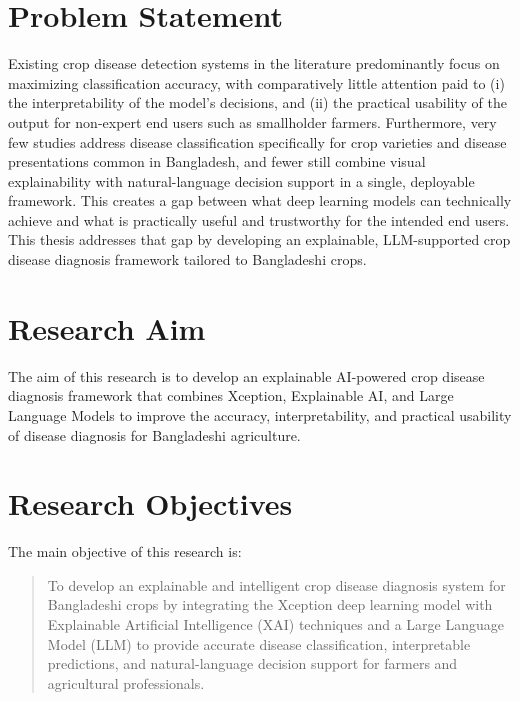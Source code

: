 \documentclass[12pt,a4paper,oneside]{report}
\begin{document}
\section{Problem Statement}
Existing crop disease detection systems in the literature predominantly focus on maximizing classification
accuracy, with comparatively little attention paid to (i) the interpretability of the model's decisions, and
(ii) the practical usability of the output for non-expert end users such as smallholder farmers. Furthermore,
very few studies address disease classification specifically for crop varieties and disease presentations common
in Bangladesh, and fewer still combine visual explainability with natural-language decision support in a single,
deployable framework. This creates a gap between what deep learning models can technically achieve and what is
practically useful and trustworthy for the intended end users. This thesis addresses that gap by developing an
explainable, LLM-supported crop disease diagnosis framework tailored to Bangladeshi crops.

\section{Research Aim}
The aim of this research is to develop an explainable AI-powered crop disease diagnosis framework that combines
Xception, Explainable AI, and Large Language Models to improve the accuracy, interpretability, and practical
usability of disease diagnosis for Bangladeshi agriculture.

\section{Research Objectives}
The main objective of this research is:
\begin{quote}
To develop an explainable and intelligent crop disease diagnosis system for Bangladeshi crops by integrating the
Xception deep learning model with Explainable Artificial Intelligence (XAI) techniques and a Large Language Model
(LLM) to provide accurate disease classification, interpretable predictions, and natural-language decision
support for farmers and agricultural professionals.
\end{quote}
\end{document}
